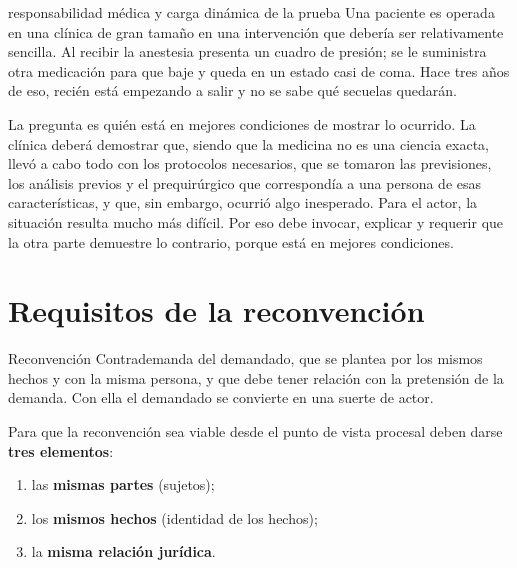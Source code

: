 \documentclass[12pt,oneside]{book}
\begin{document}
\begin{example}{responsabilidad médica y carga dinámica de la prueba}
Una paciente es operada en una clínica de gran tamaño en una intervención que debería ser relativamente sencilla. Al recibir la anestesia presenta un cuadro de presión; se le suministra otra medicación para que baje y queda en un estado casi de coma. Hace tres años de eso, recién está empezando a salir y no se sabe qué secuelas quedarán.

La pregunta es quién está en mejores condiciones de mostrar lo ocurrido. La clínica deberá demostrar que, siendo que la medicina no es una ciencia exacta, llevó a cabo todo con los protocolos necesarios, que se tomaron las previsiones, los análisis previos y el prequirúrgico que correspondía a una persona de esas características, y que, sin embargo, ocurrió algo inesperado. Para el actor, la situación resulta mucho más difícil. Por eso debe invocar, explicar y requerir que la otra parte demuestre lo contrario, porque está en mejores condiciones.
\end{example}

\section{Requisitos de la reconvención}

\begin{definition}{Reconvención}
Contrademanda del demandado, que se plantea por los mismos hechos y con la misma persona, y que debe tener relación con la pretensión de la demanda. Con ella el demandado se convierte en una suerte de actor.
\end{definition}

Para que la reconvención sea viable desde el punto de vista procesal deben darse \textbf{tres elementos}:

\begin{enumerate}
    \item las \textbf{mismas partes} (sujetos);
    \item los \textbf{mismos hechos} (identidad de los hechos);
    \item la \textbf{misma relación jurídica}.
\end{enumerate}
\end{document}
